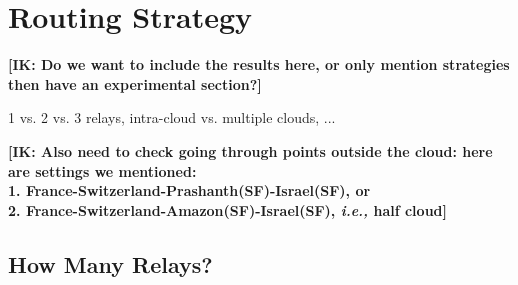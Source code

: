 \documentclass[10pt,sigconf]{acmart}
\newcommand{\mycomm}[3]{{\color{#2} \textbf{[#1: #3]}}}
\newcommand{\mycomm}[3]{}
\newcommand{\IK}[1]{\mycomm{IK}{blue}{#1}}
\newcommand{\NR}[1]{\mycomm{NR}{violet}{#1}}
\providecommand{\ie}{\emph{i.e.,} }
\begin{document}
\section{Routing Strategy}

\IK{Do we want to include the results here, or only mention strategies then have an experimental section?}

1 vs. 2 vs. 3 relays, intra-cloud vs. multiple clouds, ...


\IK{Also need to check going through points outside the cloud: here are settings we mentioned:\\
1. France-Switzerland-Prashanth(SF)-Israel(SF), or\\
2. France-Switzerland-Amazon(SF)-Israel(SF), \ie half cloud}


\subsection{How Many Relays?} \label{sec:numb_of_relays}



\end{document}
